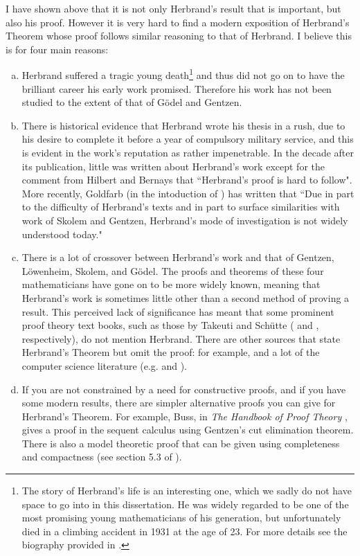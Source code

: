 \documentclass[a4paper,12pt]{report}
\theoremstyle{definition}
\begin{document}
I have shown above that it is not only Herbrand's result that is important, but also his proof. However it is very hard to find a modern exposition of Herbrand's Theorem whose proof follows similar reasoning to that of Herbrand. I believe this is for four main reasons:

\begin{enumerate}[(a)]

\item Herbrand suffered a tragic young death\footnote{The story of Herbrand's life is an interesting one, which we sadly do not have space to go into in this dissertation. He was widely regarded to be one of the most promising young mathematicians of his generation, but unfortunately died in a climbing accident in 1931 at the age of 23. For more details see the biography provided in \cite{chevalley2}.} and thus did not go on to have the brilliant career his early work promised. Therefore his work has not been studied to the extent of that of G\"o{del} and Gentzen.


\item There is historical evidence that Herbrand wrote his thesis in a rush, due to his desire to complete it before a year of compulsory military service, and this is evident in the work's reputation as rather impenetrable. In the decade after its publication, little was written about Herbrand's work except for the comment from Hilbert and Bernays \cite{hilbertbernays} that ``Herbrand's proof is hard to follow". More recently, Goldfarb (in the intoduction of \cite{herb english}) has written that ``Due in part to the difficulty of Herbrand's texts and in part to surface similarities with work of Skolem and Gentzen, Herbrand's mode of investigation is not widely understood today."


\item There is a lot of crossover between Herbrand's work and that of Gentzen, L\"o{wenheim}, Skolem, and G\"o{del}. The proofs and theorems of these four mathematicians have gone on to be more widely known, meaning that Herbrand's work is sometimes little other than a second method of proving a result. This perceived lack of significance has meant that some prominent proof theory text books, such as those by Takeuti and Sch\"u{tte} (\cite{takeuti} and \cite{schutte}, respectively), do not mention Herbrand. There are other sources that state Herbrand's Theorem but omit the proof: for example, \cite{enderton} and a lot of the computer science literature (e.g. \cite{kr&r} and \cite{ai}).


\item If you are not constrained by a need for constructive proofs, and if you have some modern results, there are simpler alternative proofs you can give for Herbrand's Theorem. For example, Buss, in \emph{The Handbook of Proof Theory} \cite{buss}, gives a proof in the sequent calculus using Gentzen's cut elimination theorem. There is also a model theoretic proof that can be given using completeness and compactness (see section 5.3 of \cite{buss OHT}).
\end{enumerate}
\end{document}
